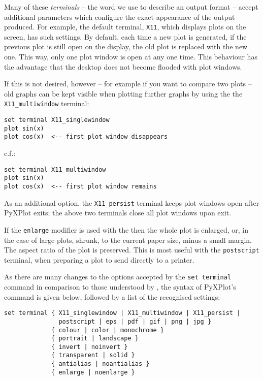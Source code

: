 Many of these {\it terminals} -- the word we use to describe an output format
-- accept additional parameters which configure the exact appearance of the
output produced.  For example, the default terminal, {\tt X11}, which displays
plots on the screen, has such settings. By default, each time a new plot is
generated, if the previous plot is still open on the display, the old plot is
replaced with the new one. This way, only one plot window is open at any one
time.  This behaviour has the advantage that the desktop does not become
flooded with plot windows.

If this is not desired, however -- for example if you want to compare two plots
-- old graphs can be kept visible when plotting further graphs by using the the
{\tt X11\_multiwindow} terminal:

\begin{verbatim} 
set terminal X11_singlewindow
plot sin(x)
plot cos(x)  <-- first plot window disappears
\end{verbatim}

\noindent c.f.:

\begin{verbatim} 
set terminal X11_multiwindow
plot sin(x)
plot cos(x)  <-- first plot window remains
\end{verbatim}

As an additional option, the {\tt X11\_persist} terminal keeps plot windows
open after PyXPlot exits; the above two terminals close all plot windows upon
exit.

If the {\tt enlarge} modifier is used with the  then the
whole plot is enlarged, or, in the case of large plots, shrunk, to the current
paper size, minus a small margin. The aspect ratio of the plot is preserved.
This is most useful with the {\tt postscript} terminal, when preparing a plot
to send directly to a printer.

As there are many changes to the options accepted by the {\tt set terminal}
command in comparison to those understood by \gnuplot, the syntax of PyXPlot's
command is given below, followed by a list of the recognised settings:

\begin{verbatim} 
set terminal { X11_singlewindow | X11_multiwindow | X11_persist |
               postscript | eps | pdf | gif | png | jpg }
             { colour | color | monochrome }
             { portrait | landscape }
             { invert | noinvert }
             { transparent | solid }
             { antialias | noantialias }
             { enlarge | noenlarge }
\end{verbatim}

